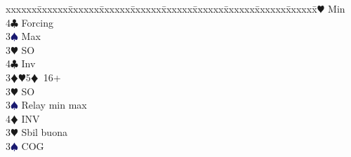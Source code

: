 \documentclass[a4paper,italian]{article}
\newcommand{\BC}{\textcolor{OliveGreen}{$\clubsuit$}}
\newcommand{\BD}{\textcolor{RedOrange}{$\vardiamondsuit$}}
\newcommand{\BH}{\textcolor{Red2}{$\varheartsuit${}}}
\newcommand{\BS}{\textcolor{MidnightBlue}{$\spadesuit${}}}
\newenvironment{bidtable}
{\begin{tabbing}

    xxxxxx\=xxxxxx\=xxxxxx\=xxxxxx\=xxxxxx\=xxxxxx\=xxxxxx\=xxxxxx\=xxxxxx\=xxxxxx\=\kill}
{\end{tabbing} }%
\begin{document}
\begin{multicols*}{2}
\begin{bidtable}
                                            3\BH \> Min\+\\
                                            4\BC \> Forcing\-\\
                                            3\BS \> Max\-\\
                                            3\BH \> SO\\
                                            4\BC \> Inv\-\\
                                            3\BD {}\BH 5\BD\ 16+\+\\
                                            3\BH \> SO\\
                                            3\BS \> Relay min max\\
                                            4\BD \> INV\-\\
                                            3\BH \> Sbil buona\+\\
                                            3\BS \> COG
                                        \end{bidtable}
                                    \end{multicols*}
                                    \newpage
\end{document}
